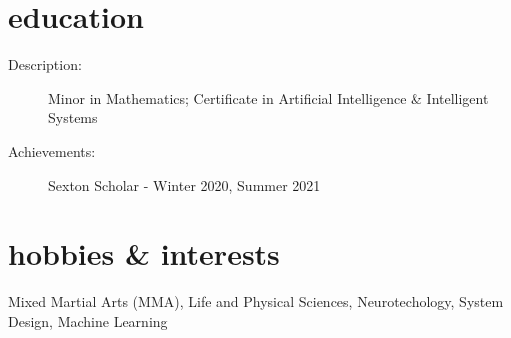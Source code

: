 \documentclass{resume}
\begin{document}
\section*{education}
\begin{description}
  \item[Description:] Minor in Mathematics; Certificate in Artificial Intelligence \& Intelligent Systems
  \item[Achievements:] Sexton Scholar - Winter 2020, Summer 2021
\end{description}
\section*{hobbies \& interests}
Mixed Martial Arts (MMA), Life and Physical Sciences, Neurotechology, System Design, Machine Learning
\end{document}
